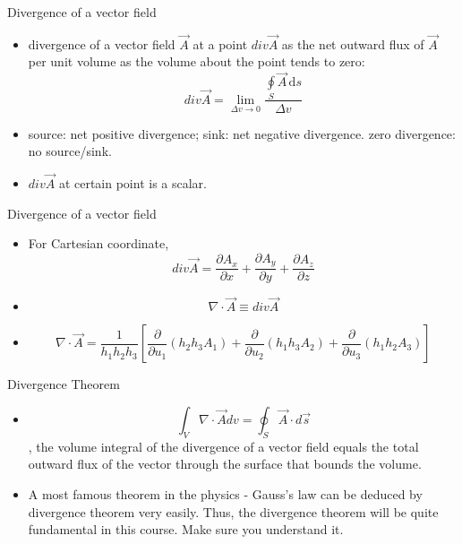 \documentclass[xcolor={dvipsnames}]{beamer}
\begin{document}
\begin{frame}{Divergence of a vector field}
\begin{itemize}
    \item divergence of a vector field $\vec{A}$ at a point $div\vec{A}$ as the net outward flux of $\vec{A}$ per unit volume as the volume about the point tends to zero: 
    \begin{equation}\label{Eq: definition-divergence-of-vector-field}
        div\vec{A} = \lim_{\Delta v\to 0}\frac{\oint\limits_{S}\vec{A}\,\mathrm{d}s}{\Delta v} 
    \end{equation}
 
    \item source: net positive divergence; sink: net negative divergence. zero divergence: no source/sink.
    \item $div\vec{A}$ at certain point is a scalar.
\end{itemize}

\end{frame}
\begin{frame}{Divergence of a vector field}
\begin{itemize}
    \item For Cartesian coordinate, 
    $$div\vec{A} = \frac{\partial A_x}{\partial x} + \frac{\partial A_y}{\partial y} + \frac{\partial A_z}{\partial z}$$
    \item $$\nabla \cdot \vec{A} \equiv div \vec{A}$$
    \item $$\nabla \cdot \vec{A} = \frac{1}{h_1h_2h_3}[\frac{\partial}{\partial u_1}(h_2h_3A_1)+\frac{\partial}{\partial u_2}(h_1h_3A_2)+\frac{\partial}{\partial u_3}(h_1h_2A_3)]$$
\end{itemize}
\end{frame}
\begin{frame}{Divergence Theorem}
\begin{itemize}
    \item $$\int_V\nabla\cdot \vec{A}dv = \oint_S\vec{A}\cdot d\vec{s}$$, the volume integral of the divergence of a vector field equals the total outward flux of the vector through the surface that bounds the volume.
    \item A most famous theorem in the physics - Gauss's law can be deduced by divergence theorem very easily. Thus, the divergence theorem will be quite fundamental in this course. Make sure you understand it.
\end{itemize}
\end{frame}
\end{document}
